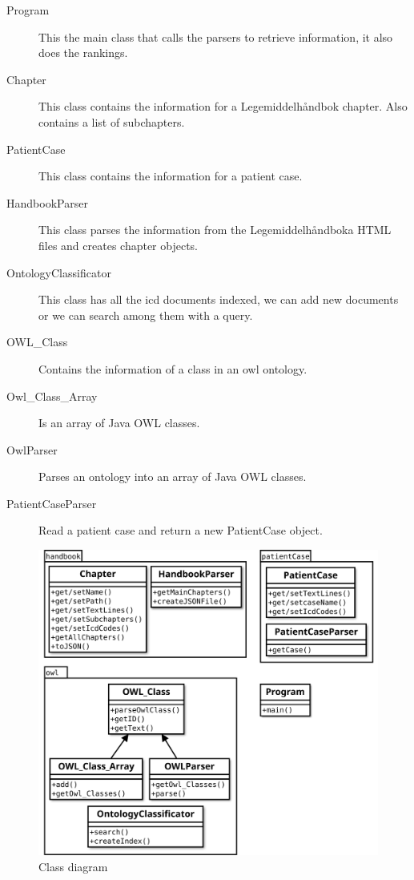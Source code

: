 \begin{description}
\item[Program]
This the main class that calls the parsers to retrieve information, it also does
the rankings.

\item[Chapter]
This class contains the information for a Legemiddelhåndbok chapter. Also
contains a list of subchapters.

\item[PatientCase] This class contains the information for a patient case.

\item[HandbookParser]
This class parses the information from the Legemiddelhåndboka HTML files and
creates chapter objects.

\item[OntologyClassificator]
This class has all the icd documents indexed, we can add new documents or we can
search among them with a query.

\item[OWL\_Class]
Contains the information of a class in an owl ontology.

\item[Owl\_Class\_Array]
Is an array of Java OWL classes.

\item[OwlParser]
Parses an ontology into an array of Java OWL classes.

\item[PatientCaseParser]
Read a patient case and return a new PatientCase object.
\end{description}

\begin{figure}[htb]
\begin{center}
    \includegraphics[width=\textwidth]{figures/class-diagram}
\end{center}
\caption{Class diagram}
\label{fig:class-diagram}
\end{figure}


